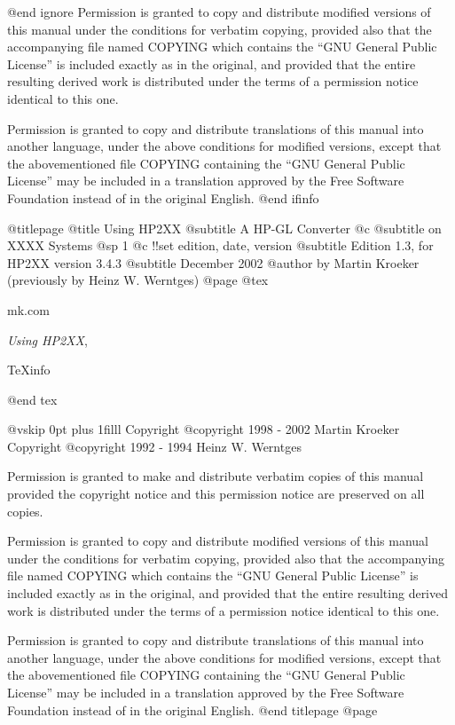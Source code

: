 @end ignore
Permission is granted to copy and distribute modified versions of this
manual under the conditions for verbatim copying, provided also that the
accompanying file named COPYING which contains the ``GNU General Public
License'' is included exactly as in the original, and provided that the
entire resulting derived work is distributed under the terms of a permission
notice identical to this one.

Permission is granted to copy and distribute translations of this manual
into another language, under the above conditions for modified versions,
except that the abovementioned file COPYING containing the
``GNU General Public License'' may be included in a translation approved
by the Free Software Foundation instead of in the original English.
@end ifinfo

@titlepage
@title Using HP2XX
@subtitle A HP-GL Converter
@c @subtitle on XXXX Systems
@sp 1
@c !!set edition, date, version
@subtitle Edition 1.3, for HP2XX version 3.4.3
@subtitle December  2002
@author by Martin Kroeker (previously by Heinz W. Werntges)
@page
@tex
{\parskip=0pt
\hfill mk\@daveg.com\par
\hfill {\it Using HP2XX}, \manvers\par
\hfill \TeX{}info \texinfoversion\par
}
@end tex

@vskip 0pt plus 1filll
Copyright @copyright{} 1998 - 2002 Martin Kroeker
Copyright @copyright{} 1992 - 1994 Heinz W. Werntges

Permission is granted to make and distribute verbatim copies of
this manual provided the copyright notice and this permission notice
are preserved on all copies.

Permission is granted to copy and distribute modified versions of this
manual under the conditions for verbatim copying, provided also that the
accompanying file named COPYING which contains the ``GNU General Public
License'' is included exactly as in the original, and provided that the
entire resulting derived work is distributed under the terms of a permission
notice identical to this one.

Permission is granted to copy and distribute translations of this manual
into another language, under the above conditions for modified versions,
except that the abovementioned file COPYING containing the
``GNU General Public License'' may be included in a translation approved
by the Free Software Foundation instead of in the original English.
@end titlepage
@page

